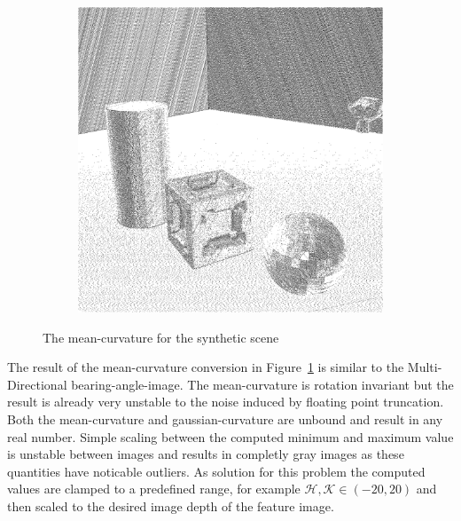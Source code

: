 \begin{figure}[H]
\begin{subfigure}[t]{0.32\textwidth}
    \end{subfigure}
    \begin{subfigure}[t]{0.32\textwidth}
        \includegraphics[width=\linewidth]{chapter04/img/mean-0210.png}
    \end{subfigure}
    \caption[\Gls{mean-curvature} in the synthetic scene]{The \Gls{mean-curvature} for the synthetic scene}\label{fig:mean-curvature}
\end{figure}
The result of the \Gls{mean-curvature} conversion in Figure~\ref{fig:mean-curvature} is similar to the Multi-Directional \gls{bearing-angle-image}.
The \gls{mean-curvature} is rotation invariant but the result is already very unstable to the noise induced by floating point truncation.
Both the \gls{mean-curvature} and \gls{gaussian-curvature} are unbound and result in any real number.
Simple scaling between the computed minimum and maximum value is unstable between images and results in completly gray images as these quantities have noticable outliers.
As solution for this problem the computed values are clamped to a predefined range, for example $\mathcal{H},\mathcal{K} \in (-20, 20)$ and then scaled to the desired image depth of the feature image.

